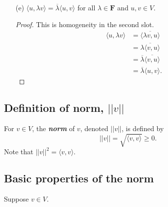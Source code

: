 \documentclass[11pt]{article}
\begin{document}
\begin{enumerate}
\begin{proof}
        \end{proof} 
        \item[(e)] \(\langle u, \lambda v \rangle = \overline{\lambda} \langle u,v \rangle\) for all \(\lambda \in \textbf{F}\) and \(u,v \in V\).  
        \begin{proof}
            This is homogeneity in the second slot.
            \begin{align*}
                \langle u, \lambda v \rangle &= \overline{\langle \lambda v, u \rangle} \\
                                             &= \overline{\lambda \langle v,u \rangle} \\
                                             &= \overline{\lambda} \overline{\langle v, u \rangle} \\
                                             &= \overline{\lambda} \langle u,v \rangle. 
            \end{align*}
        \end{proof} 
    \end{enumerate}

    \subsection{Definition of norm, \(||v||\)}

    For \(v \in V\), the \textbf{\emph{norm}} of $v$, denoted \(||v||\), is defined by \[||v|| = \sqrt{\langle v,v \rangle} \geq 0.\] Note that \(||v||^2 = \langle v,v \rangle.\)

    \subsection{Basic properties of the norm}

    Suppose \(v \in V\).
\end{document}
